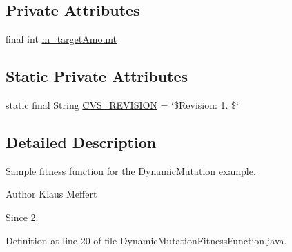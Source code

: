 \subsection*{Private Attributes}
\begin{DoxyCompactItemize}
\item 
final int \hyperlink{classexamples_1_1dynamic_mutation_1_1_dynamic_mutation_fitness_function_a05ef132b9ca65992cf44b3ccb9eb5076}{m\-\_\-target\-Amount}
\end{DoxyCompactItemize}
\subsection*{Static Private Attributes}
\begin{DoxyCompactItemize}
\item 
static final String \hyperlink{classexamples_1_1dynamic_mutation_1_1_dynamic_mutation_fitness_function_abc4a30325576d54405f21c77ab116255}{C\-V\-S\-\_\-\-R\-E\-V\-I\-S\-I\-O\-N} = \char`\"{}\$Revision\-: 1. \$\char`\"{}
\end{DoxyCompactItemize}


\subsection{Detailed Description}
Sample fitness function for the Dynamic\-Mutation example.

\begin{DoxyAuthor}{Author}
Klaus Meffert 
\end{DoxyAuthor}
\begin{DoxySince}{Since}
2. 
\end{DoxySince}


Definition at line 20 of file Dynamic\-Mutation\-Fitness\-Function.\-java.



